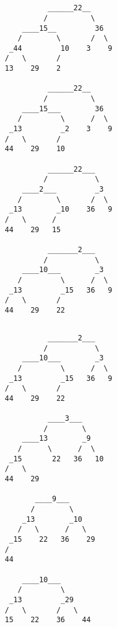 \documentclass{article}
\begin{document}
    \section{}
    \subsection{}
    \begin{lstlisting}
          ______22__
         /          \
    ____15__         36
   /        \       /  \
 _44         10    3    9
/   \       /
13    29    2

          ______22__
         /          \
    ____15___        36
   /         \      /  \
 _13         _2    3    9
/   \       /
44    29    10

          ______22___
         /           \
    ____2___         _3
   /        \       /  \
 _13        _10    36   9
/   \      /
44    29   15

          _______2___
         /           \
    ____10___        _3
   /         \      /  \
 _13         _15   36   9
/   \       /
44    29    22
    \end{lstlisting}
    \newpage
    \subsection{}
    \begin{lstlisting}           
          _______2___
         /           \
    ____10___        _3
   /         \      /  \
 _13         _15   36   9
/   \       /
44    29    22

          ____3___
         /        \
    ____13        _9
   /      \      /  \
 _15       22   36   10
/   \
44    29

       ____9___
      /        \
    _13        _10
   /   \      /   \
 _15    22   36    29
/
44

    ____10___
   /         \
 _13         _29
/   \       /   \
15    22    36    44
    \end{lstlisting}
    
\end{document}
